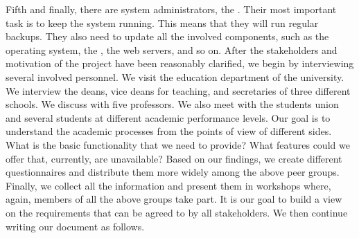 Fifth and finally, there are system administrators, the .
Their most important task is to keep the system running.
This means that they will run regular backups.
They also need to update all the involved components, such as the operating system, the \dbms, the web servers, and so on.%
\endhsection%
%
\endhsection%
%
%
After the stakeholders and motivation of the project have been reasonably clarified, we begin by interviewing several involved personnel.
We visit the education department of the university.
We interview the deans, vice deans for teaching, and secretaries of three different schools.
We discuss with five professors.
We also meet with the students union and several students at different academic performance levels.
Our goal is to understand the academic processes from the points of view of different sides.
What is the basic functionality that we need to provide?
What features could we offer that, currently, are unavailable?
Based on our findings, we create different questionnaires and distribute them more widely among the above peer groups.
Finally, we collect all the information and present them in workshops where, again, members of all the above groups take part.
It is our goal to build a view on the requirements that can be agreed to by all stakeholders.
We then continue writing our  document as follows.

